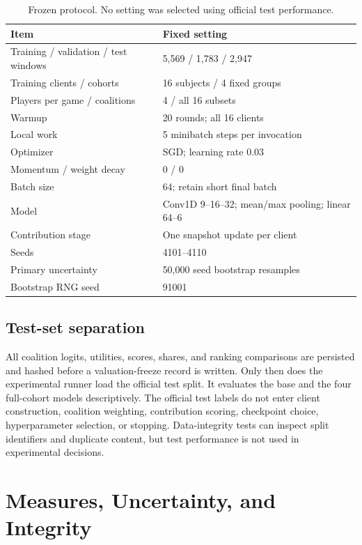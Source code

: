 \documentclass[conference,letterpaper]{IEEEtran}
\begin{document}
\begin{table}[t]
\caption{Frozen protocol. No setting was selected using official test performance.}
\label{tab:protocol}\centering\small
\begin{tabular}{p{}p{}}\toprule
Item & Fixed setting\\\midrule
Training / validation / test windows & 5,569 / 1,783 / 2,947\\
Training clients / cohorts & 16 subjects / 4 fixed groups\\
Players per game / coalitions & 4 / all 16 subsets\\
Warmup & 20 rounds; all 16 clients\\
Local work & 5 minibatch steps per invocation\\
Optimizer & SGD; learning rate 0.03\\
Momentum / weight decay & 0 / 0\\
Batch size & 64; retain short final batch\\
Model & Conv1D 9--16--32; mean/max pooling; linear 64--6\\
Contribution stage & One snapshot update per client\\
Seeds & 4101--4110\\
Primary uncertainty & 50,000 seed bootstrap resamples\\
Bootstrap RNG seed & 91001\\\bottomrule
\end{tabular}
\end{table}

\subsection{Test-set separation}
All coalition logits, utilities, scores, shares, and ranking comparisons are persisted and hashed before a valuation-freeze record is written. Only then does the experimental runner load the official test split. It evaluates the base and the four full-cohort models descriptively. The official test labels do not enter client construction, coalition weighting, contribution scoring, checkpoint choice, hyperparameter selection, or stopping. Data-integrity tests can inspect split identifiers and duplicate content, but test performance is not used in experimental decisions.

\section{Measures, Uncertainty, and Integrity}
\end{document}
